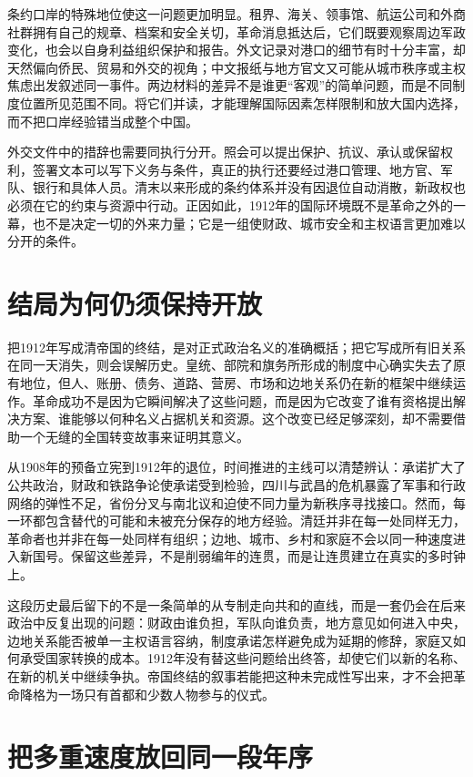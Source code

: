 条约口岸的特殊地位使这一问题更加明显。租界、海关、领事馆、航运公司和外商社群拥有自己的规章、档案和安全关切，革命消息抵达后，它们既要观察周边军政变化，也会以自身利益组织保护和报告。外文记录对港口的细节有时十分丰富，却天然偏向侨民、贸易和外交的视角；中文报纸与地方官文又可能从城市秩序或主权焦虑出发叙述同一事件。两边材料的差异不是谁更“客观”的简单问题，而是不同制度位置所见范围不同。将它们并读，才能理解国际因素怎样限制和放大国内选择，而不把口岸经验错当成整个中国。

外交文件中的措辞也需要同执行分开。照会可以提出保护、抗议、承认或保留权利，签署文本可以写下义务与条件，真正的执行还要经过港口管理、地方官、军队、银行和具体人员。清末以来形成的条约体系并没有因退位自动消散，新政权也必须在它的约束与资源中行动。正因如此，1912年的国际环境既不是革命之外的一幕，也不是决定一切的外来力量；它是一组使财政、城市安全和主权语言更加难以分开的条件。

\section{结局为何仍须保持开放}

把1912年写成清帝国的终结，是对正式政治名义的准确概括；把它写成所有旧关系在同一天消失，则会误解历史。皇统、部院和旗务所形成的制度中心确实失去了原有地位，但人、账册、债务、道路、营房、市场和边地关系仍在新的框架中继续运作。革命成功不是因为它瞬间解决了这些问题，而是因为它改变了谁有资格提出解决方案、谁能够以何种名义占据机关和资源。这个改变已经足够深刻，却不需要借助一个无缝的全国转变故事来证明其意义。

从1908年的预备立宪到1912年的退位，时间推进的主线可以清楚辨认：承诺扩大了公共政治，财政和铁路争论使承诺受到检验，四川与武昌的危机暴露了军事和行政网络的弹性不足，省份分叉与南北议和迫使不同力量为新秩序寻找接口。然而，每一环都包含替代的可能和未被充分保存的地方经验。清廷并非在每一处同样无力，革命者也并非在每一处同样有组织；边地、城市、乡村和家庭不会以同一种速度进入新国号。保留这些差异，不是削弱编年的连贯，而是让连贯建立在真实的多时钟上。

这段历史最后留下的不是一条简单的从专制走向共和的直线，而是一套仍会在后来政治中反复出现的问题：财政由谁负担，军队向谁负责，地方意见如何进入中央，边地关系能否被单一主权语言容纳，制度承诺怎样避免成为延期的修辞，家庭又如何承受国家转换的成本。1912年没有替这些问题给出终答，却使它们以新的名称、在新的机关中继续争执。帝国终结的叙事若能把这种未完成性写出来，才不会把革命降格为一场只有首都和少数人物参与的仪式。

\section{把多重速度放回同一段年序}

